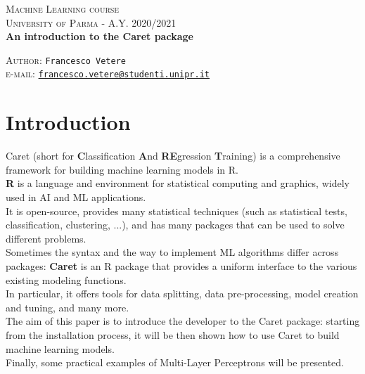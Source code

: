 \documentclass{article}
\begin{document}
\begin{titlepage}
  \begin{center}
     \Large\textsc{Machine Learning course\\University of Parma - A.Y. 2020/2021}\\
     \vspace{1cm}
     \Large\textbf{An introduction to the Caret package}\\
     \vspace{1cm}
     
      \large{\textsc{Author}: \texttt{Francesco Vetere}\\ \small \textsc{e-mail:} \href{mailto:francesco.vetere@studenti.unipr.it}{\texttt{francesco.vetere@studenti.unipr.it}} }
  \end{center}
\end{titlepage}

\tableofcontents

\pagebreak

\section{Introduction}
Caret (short for \textbf{C}lassification \textbf{A}nd \textbf{RE}gression \textbf{T}raining) is a comprehensive framework for building machine learning models in R.\\

\textbf{R} is a language and environment for statistical computing and graphics, widely used in AI and ML applications.\\
It is open-source, provides many statistical techniques (such as statistical tests, classification, clustering, ...), and has many packages that can be used to solve different problems.\\

Sometimes the syntax and the way to implement ML algorithms differ across packages: \textbf{Caret} is an R package that provides a uniform interface to the various existing modeling functions.\\
In particular, it offers tools for data splitting, data pre-processing, model creation and tuning, and many more.\\

The aim of this paper is to introduce the developer to the Caret package: starting from the installation process, it will be then shown how to use Caret to build machine learning models.\\
Finally, some practical examples of Multi-Layer Perceptrons will be presented.\\
\end{document}

